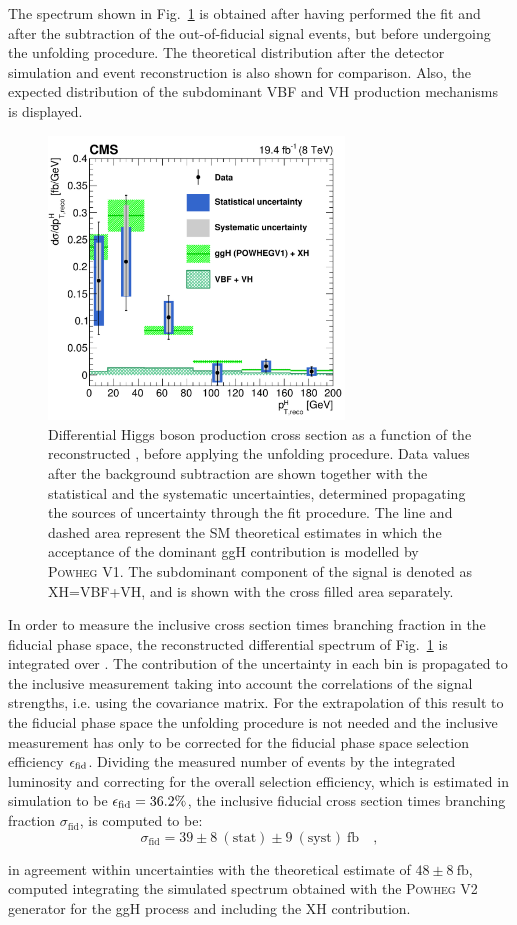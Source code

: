 The spectrum shown in Fig.~\ref{fig:pre_unfolding} is obtained after having performed the fit and after the subtraction of the out-of-fiducial signal events, but before undergoing the unfolding procedure. The theoretical distribution after the detector simulation and event reconstruction is also shown for comparison. Also, the expected distribution of the subdominant VBF and VH production mechanisms is displayed.

\begin{figure}[htb]
\centering
\includegraphics[width=0.7\textwidth]{images/unblinding/pth_reco_paper.pdf}
\caption{Differential Higgs boson production cross section as a function of the reconstructed \pth{}, before applying the unfolding procedure. Data values after the background subtraction are shown together with the statistical and the systematic uncertainties, determined propagating the sources of uncertainty through the fit procedure. The line and dashed area represent the SM theoretical estimates in which the acceptance of the dominant ggH contribution is modelled by \textsc{Powheg V1}. The subdominant component of the signal is denoted as XH=VBF+VH, and is shown with the cross filled area separately.}\label{fig:pre_unfolding}
\end{figure}

In order to measure the inclusive cross section times branching fraction in the fiducial phase space, the reconstructed differential spectrum of Fig.~\ref{fig:pre_unfolding} is integrated over \pth. The contribution of the uncertainty in each bin is propagated to the inclusive measurement taking into account the correlations of the signal strengths, i.e. using the covariance matrix. For the extrapolation of this result to the fiducial phase space the unfolding procedure is not needed and the inclusive measurement has only to be corrected for the fiducial phase space selection efficiency $\epsilon_{\rm{fid}}$. Dividing the measured number of events by the integrated luminosity and correcting for the overall selection efficiency, which is estimated in simulation to be $\epsilon_{\rm{fid}} = 36.2\%$, the inclusive fiducial cross section times branching fraction $\sigma_{\mathrm{fid}}$, is computed to be:
\begin{equation}
\sigma_{\mathrm{fid}} = 39\pm 8~(\mathrm{stat}) \pm 9~(\mathrm{syst})~\mathrm{fb} \quad ,
\end{equation} 

\noindent in agreement within uncertainties with the theoretical estimate of $48 \pm 8 ~\mathrm{fb}$, computed integrating the simulated spectrum obtained with the \textsc{Powheg V2} generator for the ggH process and including the XH contribution.

